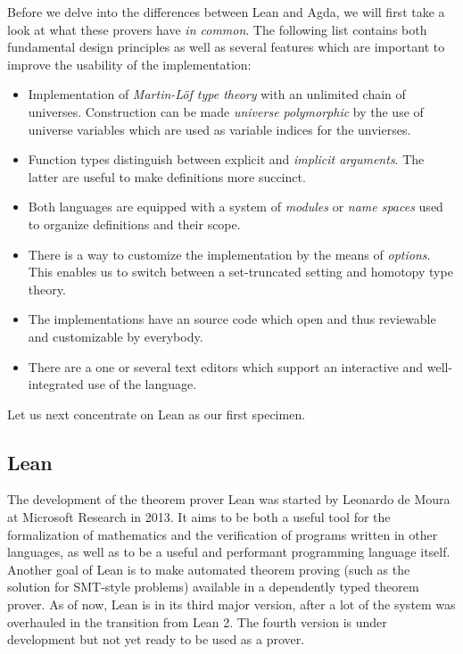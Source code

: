 Before we delve into the differences between Lean and Agda, we will first
take a look at what these provers have \emph{in common}.
The following list contains both fundamental design principles as well as
several features which are important to improve the usability of the
implementation:
\begin{itemize}
\item Implementation of \emph{Martin-Löf type theory} with an unlimited chain of universes.
Construction can be made \emph{universe polymorphic} by the use of
universe variables which are used as variable indices for the unvierses.
\item Function types distinguish between explicit and \emph{implicit arguments}.
The latter are useful to make definitions more succinct.
\item Both languages are equipped with a system of \emph{modules} or \emph{name spaces}
used to organize definitions and their scope.
\item There is a way to customize the implementation by the means of \emph{options}.
This enables us to switch between a set-truncated setting and
homotopy type theory.
\item The implementations have an source code which open and thus reviewable and
customizable by everybody.
\item There are a one or several text editors which support an interactive
and well-integrated use of the language.
\end{itemize}

Let us next concentrate on Lean as our first specimen.

\subsection{Lean}\label{sec:tt-lean}

The development of the theorem prover Lean was started by
Leonardo de Moura at Microsoft Research in 2013.
It aims to be both a useful tool for the formalization of mathematics and
the verification of programs written in other languages, as well as to
be a useful and performant programming language itself.
Another goal of Lean is to make automated theorem proving (such as the solution
for SMT-style problems) available in a dependently typed theorem prover.
As of now, Lean is in its third major version, after a lot of the system was
overhauled in the transition from Lean 2.
The fourth version is under development but not yet ready to be used as a prover.

